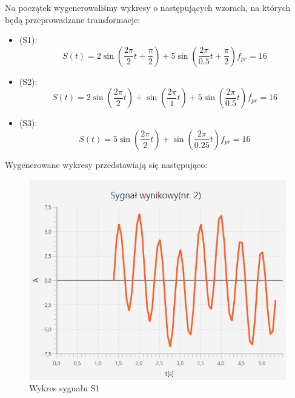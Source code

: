 \documentclass[12pt]{article}
\begin{document}
Na początek wygenerowaliśmy wykresy o następujących wzorach, na których będą przeprowadzane transformacje:
\begin{itemize}
    \item (S1):
    \begin{equation}
        S(t) = 2 \sin (\frac{2 \pi}{2}t + \frac{\pi}{2}) + 5 \sin (\frac{2 \pi}{0.5}t + \frac{\pi}{2})f_{pr} = 16
    \end{equation}
    \item (S2):
    \begin{equation}
        S(t) = 2 \sin (\frac{2 \pi}{2}t) + \sin (\frac{2 \pi}{1}t)+5 \sin (\frac{2\pi}{0.5}t) f_{pr} = 16
    \end{equation}
    \item (S3):
    \begin{equation}
        S(t) = 5 \sin (\frac{2 \pi}{2}t) + \sin (\frac{2 \pi}{0.25}t)f_{pr} = 16
    \end{equation}
\end{itemize}

Wygenerowane wykresy przedstawiają się następująco:
\begin{figure}[H]
	\centering
	\includegraphics[width=\linewidth]{S1.png}
	\caption{Wykres sygnału S1}
	\label{S1_sygnal}
\end{figure}
\end{document}
